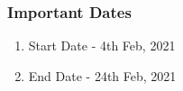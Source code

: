 \subsubsection{Important Dates}
    \begin{enumerate}
        \item Start Date - 4th Feb, 2021
        \item End Date - 24th Feb, 2021
    \end{enumerate}